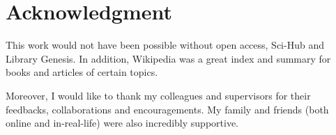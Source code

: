 \chapter{Acknowledgment}
This work would not have been possible without open access,
Sci-Hub and Library Genesis.  In addition, Wikipedia was a great index
and summary for books and articles of certain topics.

Moreover, I would like to thank my colleagues and supervisors
for their feedbacks, collaborations and encouragements.  My family and friends
(both online and in-real-life) were also incredibly supportive.
